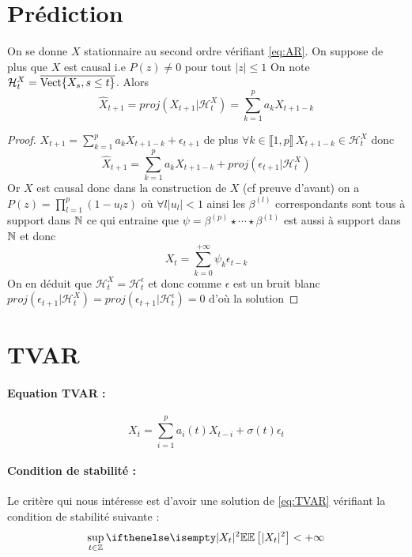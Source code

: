 \documentclass[a4paper,french]{article}
\begin{document}
\section{Prédiction}
\begin{Prop}
On se donne $X$ stationnaire au second ordre vérifiant \eqref{eq:AR}. On suppose de plus que $X$ est causal i.e $P(z) \neq 0$ pour tout $|z| \leq 1$
On note $\mathcal{H}_t^X = \overline{\mathrm{Vect}{ \left\lbrace X_s, s\leq t \right\rbrace }}$. Alors
\[ \hat{X}_{t+1} = proj(X_{t+1} | \mathcal{H}_t^X ) = \sum_{k=1}^p a_k X_{t+1-k} \]
\end{Prop}
\begin{proof}
$X_{t+1} = \sum_{k=1}^p a_k X_{t+1-k} +\epsilon_{t+1}$ de plus $\forall k \in \llbracket 1,p \rrbracket \, X_{t+1-k} \in \mathcal{H}_t^X$ donc
\[ \hat{X}_{t+1} = \sum_{k=1}^p a_k X_{t+1-k} + proj(\epsilon_{t+1} | \mathcal{H}_t^X ) \]
Or $X$ est causal donc dans la construction de $X$ (cf preuve d'avant) on a $P(z)= \prod_{l=1}^p (1-u_l z)$ où $\forall l |u_l|<1$ ainsi les $\beta^{(l)}$ correspondants sont tous à support dans $\mathbb{N}$ ce qui entraine que $\psi = \beta^{(p)} \star \cdots \star \beta^{(1)}$ est aussi à support dans $\mathbb{N}$ et donc 
\[ X_t = \sum_{k=0}^{+\infty} \psi_k \epsilon_{t-k}\] On en déduit que $\mathcal{H}_t^X = \mathcal{H}_t^\epsilon$ et donc comme $\epsilon$ est un bruit blanc $proj(\epsilon_{t+1} | \mathcal{H}_t^X ) = proj(\epsilon_{t+1} | \mathcal{H}_t^\epsilon ) = 0$ d'où la solution
\end{proof}

\section{TVAR}
\paragraph{Equation TVAR :}
\begin{equation} \label{eq:TVAR}
X_t = \sum_{i=1}^p a_i(t) X_{t-i} + \sigma(t) \epsilon_t
\end{equation}
\paragraph{Condition de stabilité :}
Le critère qui nous intéresse est d'avoir une solution de \eqref{eq:TVAR} vérifiant la condition de stabilité suivante :
\begin{equation} \label{eq:stabilite}
\sup_{t\in \zset} \EE[|X_t|^2] < +\infty
\end{equation}
\end{document}
